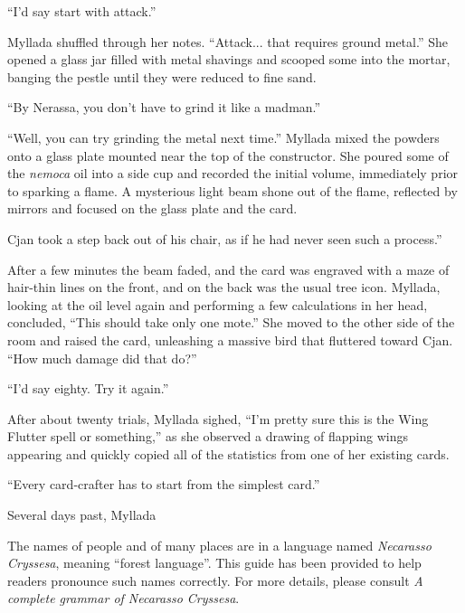 ``I'd say start with attack.''

Myllada shuffled through her notes. ``Attack... that requires ground metal.'' She opened a glass jar filled with metal shavings and scooped some into the mortar, banging the pestle until they were reduced to fine sand.

``By Nerassa, you don't have to grind it like a madman.''

``Well, you can try grinding the metal next time.'' Myllada mixed the powders onto a glass plate mounted near the top of the constructor. She poured some of the \emph{nemoca} oil into a side cup and recorded the initial volume, immediately prior to sparking a flame. A mysterious light beam shone out of the flame, reflected by mirrors and focused on the glass plate and the card.

Cjan took a step back out of his chair, as if he had never seen such a process.''

After a few minutes the beam faded, and the card was engraved with a maze of hair-thin lines on the front, and on the back was the usual tree icon. Myllada, looking at the oil level again and performing a few calculations in her head, concluded, ``This should take only one mote.'' She moved to the other side of the room and raised the card, unleashing a massive bird that fluttered toward Cjan. ``How much damage did that do?''

``I'd say eighty. Try it again.''

After about twenty trials, Myllada sighed, ``I'm pretty sure this is the Wing Flutter spell or something,'' as she observed a drawing of flapping wings appearing and quickly copied all of the statistics from one of her existing cards.

``Every card-crafter has to start from the simplest card.''

\centeredstars

Several days past, Myllada 

\appendix
\showappendices


The names of people and of many places are in a language named \emph{Necarasso Cryssesa}, meaning ``forest language''. This guide has been provided to help readers pronounce such names correctly. For more details, please consult \emph{A complete grammar of Necarasso Cryssesa}.

